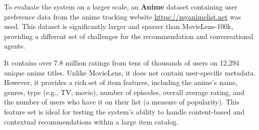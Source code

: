 To evaluate the system on a larger scale, an \textbf{Anime} dataset containing user preference data from the anime tracking website \url{https://myanimelist.net} was used. This dataset is significantly larger and sparser than MovieLens-100k, providing a different set of challenges for the recommendation and conversational agents.

It contains over 7.8 million ratings from tens of thousands of users on 12,294 unique anime titles. Unlike MovieLens, it does not contain user-specific metadata. However, it provides a rich set of item features, including the anime's name, genres, type (e.g., TV, movie), number of episodes, overall average rating, and the number of users who have it on their list (a measure of popularity). This feature set is ideal for testing the system's ability to handle content-based and contextual recommendations within a large item catalog.